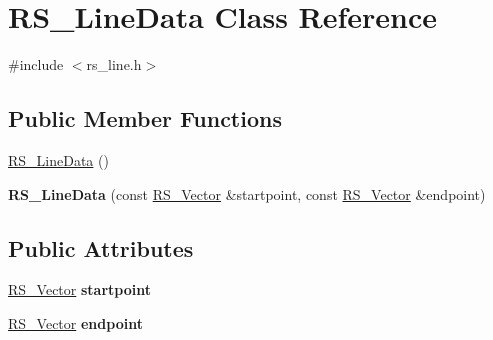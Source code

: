 \hypertarget{classRS__LineData}{\section{R\-S\-\_\-\-Line\-Data Class Reference}
\label{classRS__LineData}
}


{\ttfamily \#include $<$rs\-\_\-line.\-h$>$}

\subsection*{Public Member Functions}
\begin{DoxyCompactItemize}
\item 
\hyperlink{classRS__LineData_a04be593813dc7f00d723fad49d433ff7}{R\-S\-\_\-\-Line\-Data} ()
\item 
\hypertarget{classRS__LineData_a878813309cb41417a85d9ecf7f7bb92d}{{\bfseries R\-S\-\_\-\-Line\-Data} (const \hyperlink{classRS__Vector}{R\-S\-\_\-\-Vector} \&startpoint, const \hyperlink{classRS__Vector}{R\-S\-\_\-\-Vector} \&endpoint)}\label{classRS__LineData_a878813309cb41417a85d9ecf7f7bb92d}

\end{DoxyCompactItemize}
\subsection*{Public Attributes}
\begin{DoxyCompactItemize}
\item 
\hypertarget{classRS__LineData_a73f447bc5a0082d37ded87cdcc6d1622}{\hyperlink{classRS__Vector}{R\-S\-\_\-\-Vector} {\bfseries startpoint}}\label{classRS__LineData_a73f447bc5a0082d37ded87cdcc6d1622}

\item 
\hypertarget{classRS__LineData_a3b0b1a9a6dad638e0fe253b877a864d5}{\hyperlink{classRS__Vector}{R\-S\-\_\-\-Vector} {\bfseries endpoint}}\label{classRS__LineData_a3b0b1a9a6dad638e0fe253b877a864d5}

\end{DoxyCompactItemize}
